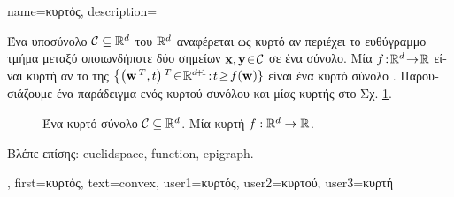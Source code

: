 {name={\foreignlanguage{greek}{κυρτός}},
	description={\foreignlanguage{greek}{Ένα υποσύνολο} 
		$\mathcal{C} \subseteq \mathbb{R}^{d}$  
		\foreignlanguage{greek}{του}  $\mathbb{R}^{d}$ \foreignlanguage{greek}{αναφέρεται ως κυρτό αν περιέχει  
		το ευθύγραμμο τμήμα μεταξύ οποιωνδήποτε δύο σημεί\-ων ${\bf x}, {\bf y}\!\in\!\mathcal{C}$ σε ένα σύνολο. Μία}   
		$f\!:\!\mathbb{R}^{d}\!\rightarrow\!\mathbb{R}$ \foreignlanguage{greek}{είναι κυρτή αν το} 
		 \foreignlanguage{greek}{της} $\big\{ \big( \weights\,^{T},t \big)\,^{T}\!\in\!\mathbb{R}^{\dimlocalmodel\!+\!1}\!:\!t\!\geq\!f(\weights) \}$ 
		\foreignlanguage{greek}{είναι ένα κυρτό σύνολο} \cite{BoydConvexBook}. \foreignlanguage{greek}{Παρουσιάζουμε ένα παράδειγμα 
		ενός κυρτού συνόλου και μίας κυρτής}  \foreignlanguage{greek}{στο Σχ.} \ref{fig_convex_set_function_dict}. 
		\begin{figure}[H]
		\begin{center}
			\vspace*{-8mm}
			\end{center}
			{
			\caption{ \foreignlanguage{greek}{Ένα κυρτό σύνολο} $\mathcal{C} \subseteq \mathbb{R}^{d}$. 
				 \foreignlanguage{greek}{Μία κυρτή}  $f: \mathbb{R}^{d} \rightarrow \mathbb{R}$.
				\label{fig_convex_set_function_dict}} }
		\end{figure}
		\foreignlanguage{greek}{Βλέπε επίσης:} \gls{euclidspace}, \gls{function}, \gls{epigraph}.},
	first={\foreignlanguage{greek}{κυρτός}},
	text={convex},
	user1={\foreignlanguage{greek}{κυρτός}}, %
	user2={\foreignlanguage{greek}{κυρτού}}, %
	user3={\foreignlanguage{greek}{κυρτή}} %
}

